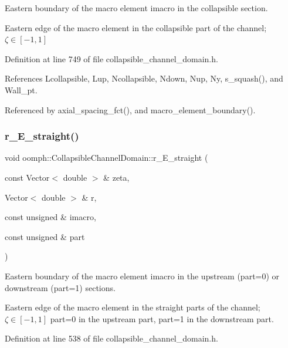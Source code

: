 Eastern boundary of the macro element imacro in the collapsible section. 

Eastern edge of the macro element in the collapsible part of the channel; $ \zeta \in [-1,1] $ 

Definition at line 749 of file collapsible\+\_\+channel\+\_\+domain.\+h.



References Lcollapsible, Lup, Ncollapsible, Ndown, Nup, Ny, s\+\_\+squash(), and Wall\+\_\+pt.



Referenced by axial\+\_\+spacing\+\_\+fct(), and macro\+\_\+element\+\_\+boundary().

\mbox{\label{classoomph_1_1CollapsibleChannelDomain_a1f880915f7c2f9163fc1ec8cac676831}} 
\subsubsection{\texorpdfstring{r\+\_\+\+E\+\_\+straight()}{r\_E\_straight()}}
{\footnotesize\ttfamily void oomph\+::\+Collapsible\+Channel\+Domain\+::r\+\_\+\+E\+\_\+straight (\begin{DoxyParamCaption}\item[{const Vector$<$ double $>$ \&}]{zeta,  }\item[{Vector$<$ double $>$ \&}]{r,  }\item[{const unsigned \&}]{imacro,  }\item[{const unsigned \&}]{part }\end{DoxyParamCaption})\hspace{0.3cm}{\ttfamily [private]}}



Eastern boundary of the macro element imacro in the upstream (part=0) or downstream (part=1) sections. 

Eastern edge of the macro element in the straight parts of the channel; $ \zeta \in [-1,1] $ part=0 in the upstream part, part=1 in the downstream part. 

Definition at line 538 of file collapsible\+\_\+channel\+\_\+domain.\+h.



